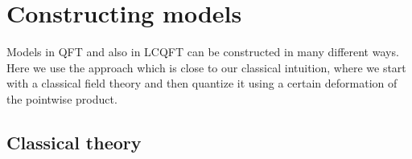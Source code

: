 \documentclass[11pt]{article}
\newcommand{\fA}{\mathfrak{A}}
\newcommand{\RR}{\mathbb{R}}           %
\newcommand{\De}{\Delta}
\newcommand{\1}{\mathds{1}}                         %
\begin{document}
{%
\section{Constructing models}
Models in QFT and also in LCQFT can be constructed in many different ways. Here we use the approach which is close to our classical intuition, where we start with a classical field theory and then quantize it using a certain deformation of the pointwise product. 
\subsection{Classical theory}
}
\end{document}
